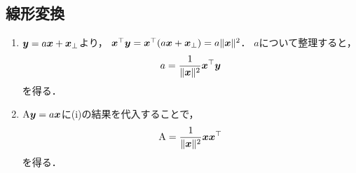 \subsection{線形変換}
  \vspace{1mm}
  \begin{enumerate}[label=(\roman*)]
    \item $\boldsymbol{y} = a \boldsymbol{x} + \boldsymbol{x}_\perp$より，
      $\boldsymbol{x}^\top \boldsymbol{y} = \boldsymbol{x}^\top (a \boldsymbol{x} + \boldsymbol{x}_\perp) = a \| \boldsymbol{x} \|^2$．
      $a$について整理すると，
      \begin{equation}
        a = \frac{1}{\| \boldsymbol{x} \|^2} \boldsymbol{x}^\top \boldsymbol{y}
      \end{equation}
      を得る．
    \item $\mathrm{A} \boldsymbol{y} = a \boldsymbol{x}$に(i)の結果を代入することで，
      \begin{equation}
        \mathrm{A} = \frac{1}{\| \boldsymbol{x} \|^2} \boldsymbol{x} \boldsymbol{x}^\top
      \end{equation}
      を得る．
  \end{enumerate}


